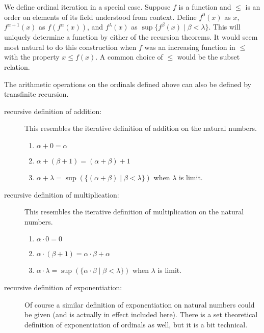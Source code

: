 \documentclass[12pt]{book}
\begin{document}
We define ordinal iteration in a special case.  Suppose $f$ is a
function and $\leq$ is an order on elements of its field understood
from context.  Define $f^0(x)$ as $x$, $f^{\alpha+1}(x)$ as
$f(f^{\alpha}(x))$, and $f^{\lambda}(x)$ as $\sup\{f^{\beta}(x) \mid
\beta<\lambda\}$.  This will uniquely determine a function by either
of the recursion theorems.  It would seem most natural to do this
construction when $f$ was an increasing function in $\leq$ with the
property $x \leq f(x)$.  A common choice of $\leq$ would be the subset
relation.

\newpage

The arithmetic operations on the ordinals defined above can also be
defined by transfinite recursion.

\begin{description}

\item[recursive definition of addition:]
This resembles the iterative definition of addition on the natural numbers.
\begin{enumerate}



\item $\alpha + 0 = \alpha$

\item $\alpha + (\beta+1) = (\alpha+\beta)+1$

\item $\alpha + \lambda = \sup(\{(\alpha+\beta)\mid \beta <\lambda\})$ when $\lambda$ is limit.

\end{enumerate}

\item[recursive definition of multiplication:]
This resembles the iterative definition of multiplication on the
natural numbers.

\begin{enumerate}


\item $\alpha\cdot 0 = 0$

\item $\alpha\cdot(\beta+1) = \alpha\cdot\beta + \alpha$

\item $\alpha\cdot\lambda  = \sup(\{\alpha\cdot\beta\mid \beta<\lambda\})$ when $\lambda$ is limit.

\end{enumerate}

\item[recursive definition of exponentiation:]
Of course a similar definition of exponentiation on natural numbers
could be given (and is actually in effect included here).  There is a
set theoretical definition of exponentiation of ordinals as well, but
it is a bit technical.


\end{description}
\end{document}
